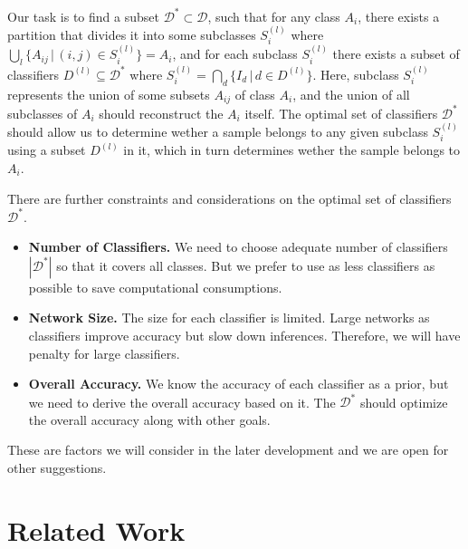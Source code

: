 \documentclass[acmsmall,nonacm]{acmart}\settopmatter{}
\begin{document}
Our task is to find a subset $\mathcal{D}^* \subset \mathcal{D}$, such that for any class $A_i$, there exists a partition that divides it into some subclasses $S_i^{(l)}$ where $\bigcup_l \{A_{ij} \,|\, (i, j) \in S_i^{(l)}\} = A_i$, and for each subclass $S_i^{(l)}$ there exists a subset of classifiers $D^{(l)} \subseteq \mathcal{D}^*$ where $S_i^{(l)} = \bigcap_d \{I_d \,|\, d \in D^{(l)}\}$.
Here, subclass $S_i^{(l)}$ represents the union of some subsets $A_{ij}$ of class $A_i$, and the union of all subclasses of $A_i$ should reconstruct the $A_i$ itself.
The optimal set of classifiers $\mathcal{D}^*$ should allow us to determine wether a sample belongs to any given subclass $S_i^{(l)}$ using a subset $D^{(l)}$ in it, which in turn determines wether the sample belongs to $A_i$.


There are further constraints and considerations on the optimal set of classifiers $\mathcal{D}^*$.
\begin{itemize}
    \item \textbf{Number of Classifiers.} We need to choose adequate number of classifiers $|\mathcal{D}^*|$ so that it covers all classes. But we prefer to use as less classifiers as possible to save computational consumptions.
    \item \textbf{Network Size.} The size for each classifier is limited. Large networks as classifiers improve accuracy but slow down inferences. Therefore, we will have penalty for large classifiers.
    \item \textbf{Overall Accuracy.} We know the accuracy of each classifier as a prior, but we need to derive the overall accuracy based on it. The $\mathcal{D}^*$ should optimize the overall accuracy along with other goals.
\end{itemize}
These are factors we will consider in the later development and we are open for other suggestions.

\section{Related Work}



% 
% 




\end{document}
